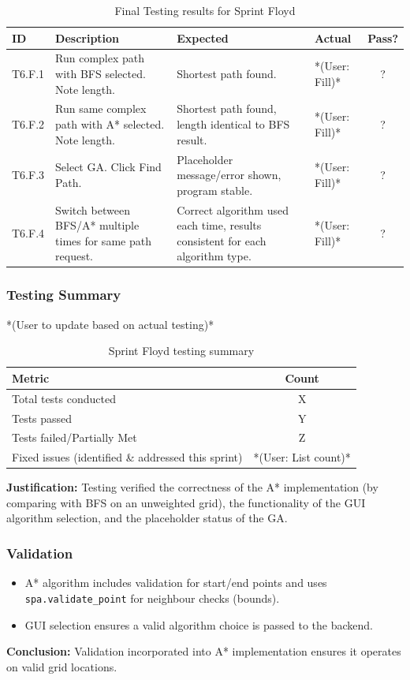 \begin{table}[htbp] %
	\centering
	\begin{tabularx}{\textwidth}{|l|X|p{3.5cm}|p{3.5cm}|c|}
		\hline
		\textbf{ID} & \textbf{Description} & \textbf{Expected} & \textbf{Actual} & \textbf{Pass?} \\
		\hline
		T6.F.1 & Run complex path with BFS selected. Note length. & Shortest path found. & *(User: Fill)* & ? \\
		\hline
		T6.F.2 & Run same complex path with A* selected. Note length. & Shortest path found, length identical to BFS result. & *(User: Fill)* & ? \\
		\hline
		T6.F.3 & Select GA. Click Find Path. & Placeholder message/error shown, program stable. & *(User: Fill)* & ? \\
		\hline
		T6.F.4 & Switch between BFS/A* multiple times for same path request. & Correct algorithm used each time, results consistent for each algorithm type. & *(User: Fill)* & ? \\
		\hline
	\end{tabularx}
	\caption{Final Testing results for Sprint Floyd}
\end{table}

\newpage

\subsubsection{Testing Summary}
*(User to update based on actual testing)*
\begin{table}[htbp]
	\centering
	\begin{tabular}{|l|c|}
		\hline
		\textbf{Metric} & \textbf{Count} \\
		\hline
		Total tests conducted & X \\ %
		\hline
		Tests passed & Y \\
		\hline
		Tests failed/Partially Met & Z \\
		\hline
		Fixed issues (identified \& addressed this sprint) & *(User: List count)* \\
		\hline
	\end{tabular}
	\caption{Sprint Floyd testing summary}
\end{table}
\textbf{Justification:} Testing verified the correctness of the A* implementation (by comparing with BFS on an unweighted grid), the functionality of the GUI algorithm selection, and the placeholder status of the GA.

\subsubsection{Validation}
\begin{itemize}
	\item A* algorithm includes validation for start/end points and uses \verb|spa.validate_point| for neighbour checks (bounds).
	\item GUI selection ensures a valid algorithm choice is passed to the backend.
\end{itemize}
\textbf{Conclusion:} Validation incorporated into A* implementation ensures it operates on valid grid locations.

